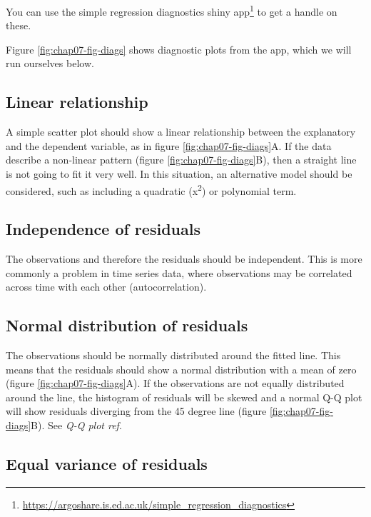 \documentclass[12pt,]{krantz}
\renewcommand{\href}[2]{#2\footnote{\url{#1}}}
\theoremstyle{definition}
\theoremstyle{definition}
\theoremstyle{definition}
\theoremstyle{remark}
\begin{document}
You can use the
\href{https://argoshare.is.ed.ac.uk/simple_regression_diagnostics}{simple
regression diagnostics shiny app} to get a handle on these.

Figure \ref{fig:chap07-fig-diags} shows diagnostic plots from the app,
which we will run ourselves below.

\hypertarget{linear-relationship}{%
\subsection{Linear relationship}\label{linear-relationship}}

A simple scatter plot should show a linear relationship between the
explanatory and the dependent variable, as in figure
\ref{fig:chap07-fig-diags}A. If the data describe a non-linear pattern
(figure \ref{fig:chap07-fig-diags}B), then a straight line is not going
to fit it very well. In this situation, an alternative model should be
considered, such as including a quadratic (x\textsuperscript{2}) or
polynomial term.

\hypertarget{independence-of-residuals}{%
\subsection{Independence of residuals}\label{independence-of-residuals}}

The observations and therefore the residuals should be independent. This
is more commonly a problem in time series data, where observations may
be correlated across time with each other (autocorrelation).

\hypertarget{normal-distribution-of-residuals}{%
\subsection{Normal distribution of
residuals}\label{normal-distribution-of-residuals}}

The observations should be normally distributed around the fitted line.
This means that the residuals should show a normal distribution with a
mean of zero (figure \ref{fig:chap07-fig-diags}A). If the observations
are not equally distributed around the line, the histogram of residuals
will be skewed and a normal Q-Q plot will show residuals diverging from
the 45 degree line (figure \ref{fig:chap07-fig-diags}B). See \emph{Q-Q
plot ref}.

\hypertarget{equal-variance-of-residuals}{%
\subsection{Equal variance of
residuals}\label{equal-variance-of-residuals}}
\end{document}
